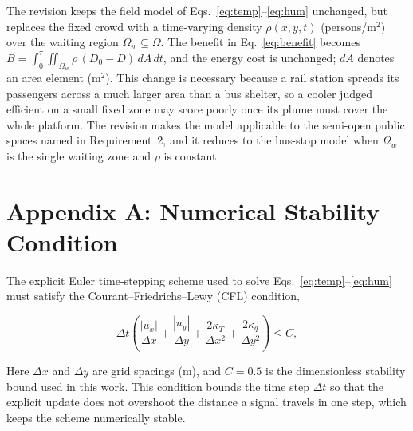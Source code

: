\documentclass[11pt]{article}
\begin{document}
The revision keeps the field model of Eqs.~\eqref{eq:temp}--\eqref{eq:hum}
unchanged, but replaces the fixed crowd with a time-varying density
$\rho(x,y,t)$ (persons/m$^2$) over the waiting region $\Omega_w\subseteq\Omega$. The benefit in
Eq.~\eqref{eq:benefit} becomes
$B=\int_0^{\tau}\!\iint_{\Omega_w}\rho\,(D_0-D)\,dA\,dt$, and the energy cost is
unchanged; $dA$ denotes an area element (m$^2$). This change is necessary because a rail station spreads its
passengers across a much larger area than a bus shelter, so a cooler judged
efficient on a small fixed zone may score poorly once its plume must cover the
whole platform. The revision makes the model applicable to the semi-open public
spaces named in Requirement~2, and it reduces to the bus-stop model when
$\Omega_w$ is the single waiting zone and $\rho$ is constant.

\section*{Appendix A: Numerical Stability Condition}

The explicit Euler time-stepping scheme used to solve
Eqs.~\eqref{eq:temp}--\eqref{eq:hum} must satisfy the
Courant--Friedrichs--Lewy (CFL) condition,

\begin{equation}
\Delta t\left(\frac{|u_x|}{\Delta x}+\frac{|u_y|}{\Delta y}
+\frac{2\kappa_T}{\Delta x^2}+\frac{2\kappa_q}{\Delta y^2}\right) \le C,
\label{eq:cfl}
\end{equation}

Here $\Delta x$ and $\Delta y$ are grid spacings (m), and $C=0.5$ is the
dimensionless stability bound used in this work. This condition bounds the time step $\Delta t$ so
that the explicit update does not overshoot the distance a signal travels in one
step, which keeps the scheme numerically stable.
\end{document}
